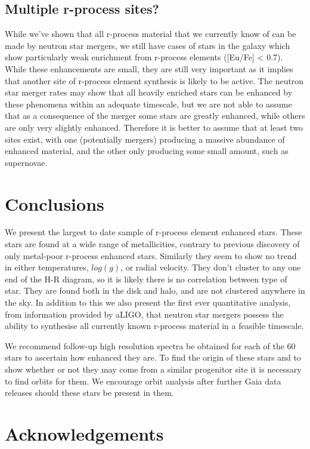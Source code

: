 \documentclass[a4paper,fleqn,usenatbib]{mnras}
\begin{document}
	\subsection{Multiple r-process sites?}
	While we've shown that all r-process material that we currently know of can be made by neutron star mergers, we still have cases of stars in the galaxy which show particularly weak enrichment from r-process elements ([Eu/Fe] < 0.7). While these enhancements are small, they are still very important as it implies that another site of r-process element synthesis is likely to be active. The neutron star merger rates may show that all heavily enriched stars can be enhanced by these phenomena within an adequate timescale, but we are not able to assume that as a consequence of the merger some stars are greatly enhanced, while others are only very slightly enhanced. Therefore it is better to assume that at least two sites exist, with one (potentially mergers) producing a massive abundance of enhanced material, and the other only producing some small amount, such as supernovae.
	
	\section{Conclusions}
	We present the largest to date sample of r-process element enhanced stars. These stars are found at a wide range of metallicities, contrary to previous discovery of only metal-poor r-process enhanced stars. Similarly they seem to show no trend in either temperatures, $log(g)$, or radial velocity. They don't cluster to any one end of the H-R diagram, so it is likely there is no correlation between type of star. They are found both in the disk and halo, and are not clustered anywhere in the sky. In addition to this we also present the first ever quantitative analysis, from information provided by aLIGO, that neutron star mergers possess the ability to synthesise all currently known r-process material in a feasible timescale. 
	
	We recommend follow-up high resolution spectra be obtained for each of the 60 stars to ascertain how enhanced they are. To find the origin of these stars and to show whether or not they may come from a similar progenitor site it is necessary to find orbits for them. We encourage orbit analysis after further Gaia data releases should these stars be present in them.
	
	\section*{Acknowledgements}
	
\end{document}
